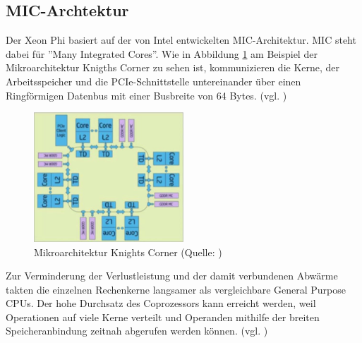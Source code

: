 \documentclass[../main.tex]{subfiles}
\begin{document}
\subsection{MIC-Archtektur}
Der Xeon Phi basiert auf der von Intel entwickelten MIC-Architektur. MIC steht dabei für ''Many Integrated Cores''. 
Wie in Abbildung \ref{pic:knightscorner} am Beispiel der Mikroarchitektur Knigths Corner zu sehen ist, kommunizieren die Kerne, der Arbeitsspeicher und die PCIe-Schnittstelle untereinander über einen Ringförmigen Datenbus mit einer Busbreite von 64 Bytes. (vgl. \cite{xeonphiJumpstart})
\begin{figure}
    \centering 
       \includegraphics[width=0.5\textwidth]{../images/Schmidt/intel_mic_diagram.jpg} 
    \caption {Mikroarchitektur Knights Corner (Quelle: \parencite{xeonphiJumpstart})}
    \label{pic:knightscorner} 
\end{figure}
Zur Verminderung der Verlustleistung und der damit verbundenen Abwärme takten die einzelnen Rechenkerne langsamer als vergleichbare General Purpose CPUs. Der hohe Durchsatz des Coprozessors kann erreicht werden, weil Operationen auf viele Kerne verteilt und Operanden mithilfe der breiten Speicheranbindung zeitnah abgerufen werden können. (vgl. \cite{xeonphiJumpstart})
\end{document}
